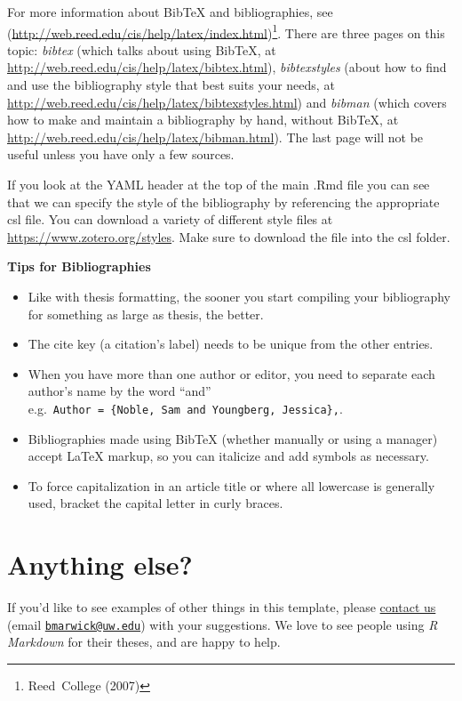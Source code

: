 \documentclass[print]{nuthesis}
\providecommand{\tightlist}{%
  \setlength{\itemsep}{0pt}\setlength{\parskip}{0pt}}
\begin{document}
For more information about BibTeX and bibliographies, see (\url{http://web.reed.edu/cis/help/latex/index.html})\footnote{Reed~College (2007)}. There are three pages on this topic: \emph{bibtex} (which talks about using BibTeX, at \url{http://web.reed.edu/cis/help/latex/bibtex.html}), \emph{bibtexstyles} (about how to find and use the bibliography style that best suits your needs, at \url{http://web.reed.edu/cis/help/latex/bibtexstyles.html}) and \emph{bibman} (which covers how to make and maintain a bibliography by hand, without BibTeX, at \url{http://web.reed.edu/cis/help/latex/bibman.html}). The last page will not be useful unless you have only a few sources.

If you look at the YAML header at the top of the main .Rmd file you can see that we can specify the style of the bibliography by referencing the appropriate csl file. You can download a variety of different style files at \url{https://www.zotero.org/styles}. Make sure to download the file into the csl folder.

\textbf{Tips for Bibliographies}

\begin{itemize}
\tightlist
\item
  Like with thesis formatting, the sooner you start compiling your bibliography for something as large as thesis, the better.
\item
  The cite key (a citation's label) needs to be unique from the other entries.
\item
  When you have more than one author or editor, you need to separate each author's name by the word ``and'' e.g.~\texttt{Author\ =\ \{Noble,\ Sam\ and\ Youngberg,\ Jessica\},}.
\item
  Bibliographies made using BibTeX (whether manually or using a manager) accept LaTeX markup, so you can italicize and add symbols as necessary.
\item
  To force capitalization in an article title or where all lowercase is generally used, bracket the capital letter in curly braces.
\end{itemize}

\hypertarget{anything-else}{%
\section{Anything else?}\label{anything-else}}

If you'd like to see examples of other things in this template, please \href{https://github.com/benmarwick/huskydown/issues/new}{contact us} (email \href{mailto:bmarwick@uw.edu}{\nolinkurl{bmarwick@uw.edu}}) with your suggestions. We love to see people using \emph{R Markdown} for their theses, and are happy to help.
\end{document}
